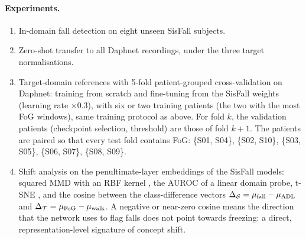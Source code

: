 \paragraph{Experiments.}
\begin{enumerate}
  \item[E1] In-domain fall detection on eight unseen SisFall subjects.
  \item[E2] Zero-shot transfer to all Daphnet recordings, under the three target normalisations.
  \item[E3] Target-domain references with 5-fold patient-grouped cross-validation on Daphnet: training
  from scratch and fine-tuning from the SisFall weights (learning rate $\times0.3$), with six or two
  training patients (the two with the most FoG windows), same training protocol as above. For fold
  $k$, the validation patients (checkpoint selection, threshold) are those of fold $k{+}1$. The
  patients are paired so that every test fold contains FoG: \{S01, S04\}, \{S02, S10\}, \{S03, S05\},
  \{S06, S07\}, \{S08, S09\}.
  \item[E4] Shift analysis on the penultimate-layer embeddings of the SisFall models: squared MMD with an
  RBF kernel \parencite{gretton2012mmd}, the AUROC of a linear domain probe, t-SNE
  \parencite{vandermaaten2008tsne}, and the cosine between the class-difference vectors
  $\Delta_{\mathcal{S}}=\mu_{\mathrm{fall}}-\mu_{\mathrm{ADL}}$ and $\Delta_{\mathcal{T}}=\mu_{\mathrm{FoG}}-\mu_{\mathrm{walk}}$.
  A negative or near-zero cosine means the direction that the network uses to flag falls does not
  point towards freezing: a direct, representation-level signature of concept shift.
\end{enumerate}
